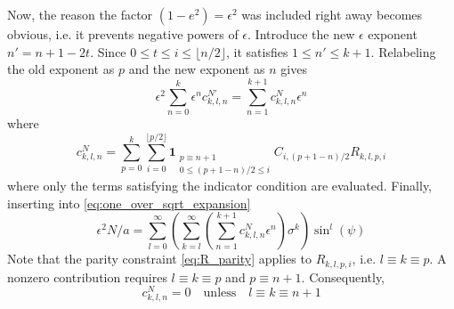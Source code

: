 \documentclass[a4paper]{amsart}
\begin{document}
Now, the reason the factor $(1-e^2)=\epsilon^2$ was included right away becomes obvious, i.e. it prevents negative powers of $\epsilon$.
%
Introduce the new $\epsilon$ exponent $n'=n+1-2t$. Since $0\leq t\leq i\leq\lfloor n/2\rfloor$, it satisfies $1\leq n'\leq k+1$. Relabeling the old exponent as $p$ and the new exponent as $n$ gives
%
\begin{equation*}
\epsilon^2\sum_{n=0}^k\epsilon^nc^{N'}_{k,l,n}=\sum_{n=1}^{k+1}c^N_{k,l,n}\epsilon^n
\end{equation*}
where
\begin{equation}
c^N_{k,l,n}=\sum_{p=0}^{k}\sum_{i=0}^{\lfloor p/2\rfloor}
\mathbf{1}_{\substack{p\equiv n+1\\0\le (p+1-n)/2\le i}}
C_{i,(p+1-n)/2}R_{k,l,p,i}
\end{equation}
where only the terms satisfying the indicator condition are evaluated.
Finally, inserting into \eqref{eq:one_over_sqrt_expansion}
\begin{equation}\label{eq:N_series}
\epsilon^2N/a=\sum_{l=0}^\infty\left(\sum_{k=l}^\infty\left(\sum_{n=1}^{k+1}c^N_{k,l,n}\epsilon^n\right)\sigma^k\right)\sin^l(\psi)
\end{equation}
Note that the parity constraint \eqref{eq:R_parity} applies to $R_{k,l,p,i}$, i.e. $l\equiv k\equiv p$.
%
A nonzero contribution requires $l\equiv k\equiv p$ and $p\equiv n+1$. Consequently,
%
\begin{equation*}
c^N_{k,l,n}=0\quad\text{unless}\quad l\equiv k\equiv n+1
\end{equation*}
\end{document}
